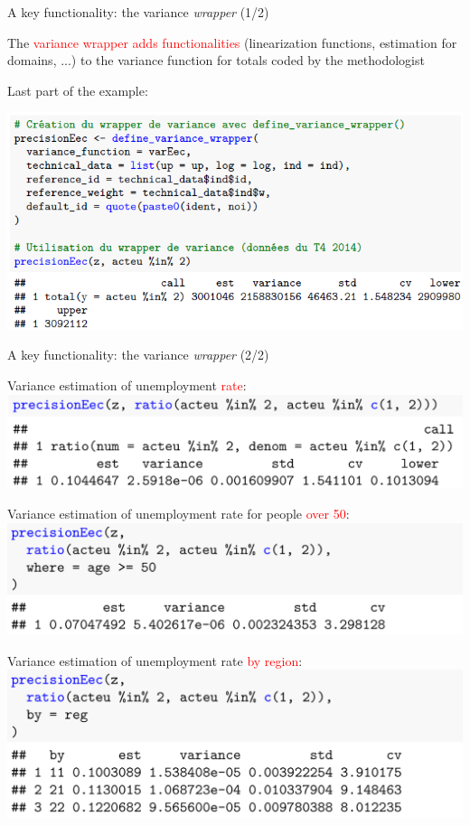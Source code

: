 \documentclass[xcolor=dvipsnames]{beamer}
\begin{document}
\begin{frame}{A key functionality: the variance \textit{wrapper} (1/2)}

The \textcolor{red}{variance wrapper adds functionalities} (linearization functions, estimation for domains, ...) to the variance function for totals coded by the methodologist

\vspace{0.5cm}

Last part of the example:
\begin{center}
    \includegraphics[width = 10 cm]{EEC_3.png}
\end{center}

\end{frame}


\begin{frame}{A key functionality: the variance \textit{wrapper} (2/2)}

Variance estimation of unemployment \textcolor{red}{rate}:
\includegraphics[width = 7 cm]{EEC_5.png}

\vspace{0.1 cm} 

Variance estimation of unemployment rate for people \textcolor{red}{over 50}:
\includegraphics[width = 7 cm]{EEC_6.png}

\vspace{0.1 cm} 
Variance estimation of unemployment rate \textcolor{red}{by region}:
\includegraphics[width = 7 cm]{EEC_7.png}


\end{frame}
\end{document}
